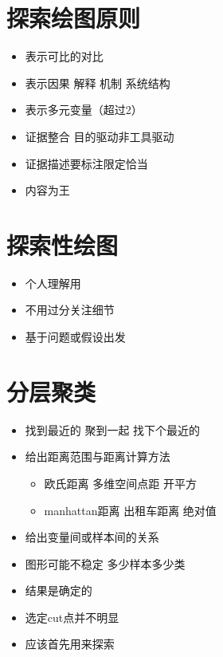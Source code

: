\documentclass[]{book}
\providecommand{\tightlist}{%
  \setlength{\itemsep}{0pt}\setlength{\parskip}{0pt}}
\begin{document}
\hypertarget{ux63a2ux7d22ux7ed8ux56feux539fux5219}{%
\section{探索绘图原则}\label{ux63a2ux7d22ux7ed8ux56feux539fux5219}}

\begin{itemize}
\tightlist
\item
  表示可比的对比
\item
  表示因果 解释 机制 系统结构
\item
  表示多元变量（超过2）
\item
  证据整合 目的驱动非工具驱动
\item
  证据描述要标注限定恰当
\item
  内容为王
\end{itemize}

\hypertarget{ux63a2ux7d22ux6027ux7ed8ux56fe}{%
\section{探索性绘图}\label{ux63a2ux7d22ux6027ux7ed8ux56fe}}

\begin{itemize}
\tightlist
\item
  个人理解用
\item
  不用过分关注细节
\item
  基于问题或假设出发
\end{itemize}

\hypertarget{ux5206ux5c42ux805aux7c7b}{%
\section{分层聚类}\label{ux5206ux5c42ux805aux7c7b}}

\begin{itemize}
\tightlist
\item
  找到最近的 聚到一起 找下个最近的
\item
  给出距离范围与距离计算方法

  \begin{itemize}
  \tightlist
  \item
    欧氏距离 多维空间点距 开平方
  \item
    manhattan距离 出租车距离 绝对值
  \end{itemize}
\item
  给出变量间或样本间的关系
\item
  图形可能不稳定 多少样本多少类
\item
  结果是确定的
\item
  选定cut点并不明显
\item
  应该首先用来探索
\end{itemize}
\end{document}
